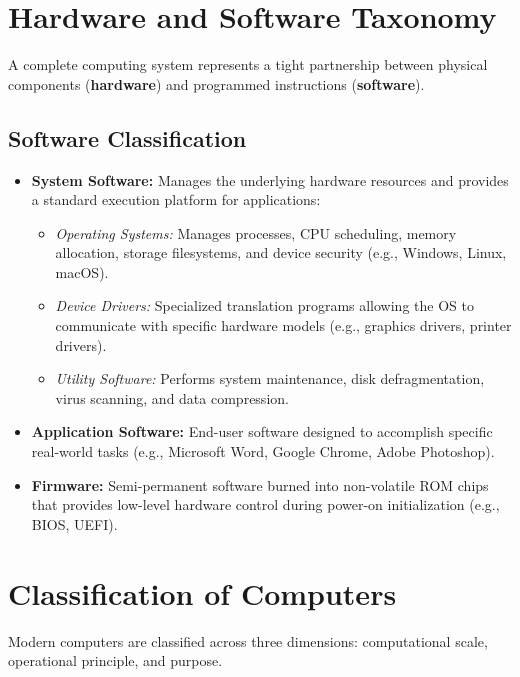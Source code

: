 \section{Hardware and Software Taxonomy}

A complete computing system represents a tight partnership between physical components (\textbf{hardware}) and programmed instructions (\textbf{software}).

\subsection{Software Classification}
\begin{itemize}[leftmargin=1.2em]
    \item \textbf{System Software:} Manages the underlying hardware resources and provides a standard execution platform for applications:
    \begin{itemize}
        \item \textit{Operating Systems:} Manages processes, CPU scheduling, memory allocation, storage filesystems, and device security (e.g., Windows, Linux, macOS).
        \item \textit{Device Drivers:} Specialized translation programs allowing the OS to communicate with specific hardware models (e.g., graphics drivers, printer drivers).
        \item \textit{Utility Software:} Performs system maintenance, disk defragmentation, virus scanning, and data compression.
    \end{itemize}
    \item \textbf{Application Software:} End-user software designed to accomplish specific real-world tasks (e.g., Microsoft Word, Google Chrome, Adobe Photoshop).
    \item \textbf{Firmware:} Semi-permanent software burned into non-volatile ROM chips that provides low-level hardware control during power-on initialization (e.g., BIOS, UEFI).
\end{itemize}

\section{Classification of Computers}

Modern computers are classified across three dimensions: computational scale, operational principle, and purpose.


